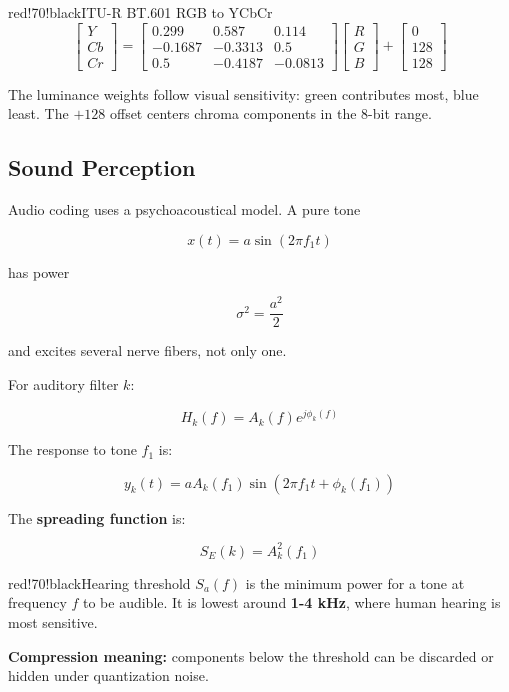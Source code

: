 \begin{calloutbox}{red!70!black}{ITU-R BT.601 RGB to YCbCr}
\[
\begin{bmatrix}
Y\\
Cb\\
Cr
\end{bmatrix}
=
\begin{bmatrix}
0.299 & 0.587 & 0.114\\
-0.1687 & -0.3313 & 0.5\\
0.5 & -0.4187 & -0.0813
\end{bmatrix}
\begin{bmatrix}
R\\
G\\
B
\end{bmatrix}
+
\begin{bmatrix}
0\\
128\\
128
\end{bmatrix}
\]

The luminance weights follow visual sensitivity: green contributes most, blue least. The $+128$ offset centers chroma components in the 8-bit range.
\end{calloutbox}

\subsection{Sound Perception}

Audio coding uses a psychoacoustical model. A pure tone

\[
x(t)=a\sin(2\pi f_1 t)
\]

has power

\[
\sigma^2 = \frac{a^2}{2}
\]

and excites several nerve fibers, not only one.

For auditory filter $k$:

\[
H_k(f)=A_k(f)e^{j\phi_k(f)}
\]

The response to tone $f_1$ is:

\[
y_k(t)=aA_k(f_1)\sin(2\pi f_1t+\phi_k(f_1))
\]

The \textbf{spreading function} is:

\[
S_E(k)=A_k^2(f_1)
\]

\begin{calloutbox}{red!70!black}{Hearing threshold}
$S_a(f)$ is the minimum power for a tone at frequency $f$ to be audible. It is lowest around \textbf{1-4 kHz}, where human hearing is most sensitive.

\textbf{Compression meaning:} components below the threshold can be discarded or hidden under quantization noise.
\end{calloutbox}

